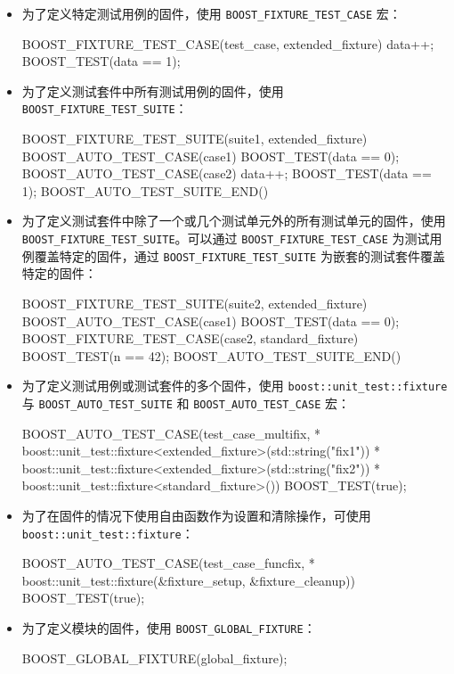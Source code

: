 \begin{itemize}
\item
为了定义特定测试用例的固件，使用 \verb|BOOST_FIXTURE_TEST_CASE| 宏：

\begin{cpp}
BOOST_FIXTURE_TEST_CASE(test_case, extended_fixture)
{
    data++;
    BOOST_TEST(data == 1);
}
\end{cpp}

\item
为了定义测试套件中所有测试用例的固件，使用 \verb|BOOST_FIXTURE_TEST_SUITE|：

\begin{cpp}
BOOST_FIXTURE_TEST_SUITE(suite1, extended_fixture)
BOOST_AUTO_TEST_CASE(case1)
{
    BOOST_TEST(data == 0);
}
BOOST_AUTO_TEST_CASE(case2)
{
    data++;
    BOOST_TEST(data == 1);
}
BOOST_AUTO_TEST_SUITE_END()
\end{cpp}

\item
为了定义测试套件中除了一个或几个测试单元外的所有测试单元的固件，使用 \verb|BOOST_FIXTURE_TEST_SUITE|。可以通过 \verb|BOOST_FIXTURE_TEST_CASE| 为测试用例覆盖特定的固件，通过 \verb|BOOST_FIXTURE_TEST_SUITE| 为嵌套的测试套件覆盖特定的固件：

\begin{cpp}
BOOST_FIXTURE_TEST_SUITE(suite2, extended_fixture)
BOOST_AUTO_TEST_CASE(case1)
{
    BOOST_TEST(data == 0);
}
BOOST_FIXTURE_TEST_CASE(case2, standard_fixture)
{
    BOOST_TEST(n == 42);
}
BOOST_AUTO_TEST_SUITE_END()
\end{cpp}

\item
为了定义测试用例或测试套件的多个固件，使用 \verb|boost::unit_test::fixture| 与 \verb|BOOST_AUTO_TEST_SUITE| 和 \verb|BOOST_AUTO_TEST_CASE| 宏：

\begin{cpp}
BOOST_AUTO_TEST_CASE(test_case_multifix,
    * boost::unit_test::fixture<extended_fixture>(std::string("fix1"))
    * boost::unit_test::fixture<extended_fixture>(std::string("fix2"))
    * boost::unit_test::fixture<standard_fixture>())
{
    BOOST_TEST(true);
}
\end{cpp}

\item
为了在固件的情况下使用自由函数作为设置和清除操作，可使用 \verb|boost::unit_test::fixture|：

\begin{cpp}
BOOST_AUTO_TEST_CASE(test_case_funcfix,
    * boost::unit_test::fixture(&fixture_setup, &fixture_cleanup))
{
    BOOST_TEST(true);
}
\end{cpp}

\item
为了定义模块的固件，使用 \verb|BOOST_GLOBAL_FIXTURE|：

\begin{cpp}
BOOST_GLOBAL_FIXTURE(global_fixture);
\end{cpp}
\end{itemize}


